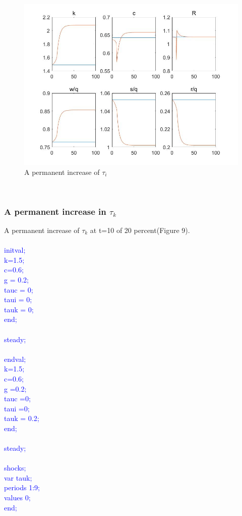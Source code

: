 \documentclass[a4paper,12pt]{scrartcl} %
\begin{document}
\begin{figure}[htbp!]
		\centering
			\includegraphics[width=0.8\linewidth]{fig8.jpg}
            \caption{A permanent increase of $\tau_i$}\label{8}
\end{figure}

\vspace{8cm}
~~
\subsubsection{A permanent increase in $\tau_k$}

A permanent increase of $\tau_k$ at t=10 of 20 percent(Figure 9).\\
\\
\textcolor{blue}{
initval;\\
k=1.5;\\
c=0.6;\\
g = 0.2;\\
tauc = 0;\\
taui = 0;\\
tauk = 0;\\
end;\\
\\
steady;\\
\\
endval;\\
k=1.5;\\
c=0.6;\\
g =0.2;\\
tauc =0;\\
taui =0;\\
tauk = 0.2;\\
end;\\
\\
steady;\\
\\
shocks;\\
var tauk;\\
periods 1:9;\\
values 0;\\
end;}\\
\end{document}
